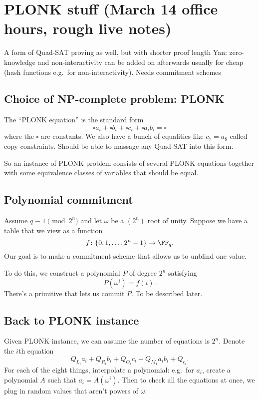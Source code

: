 \documentclass[11pt]{scrreprt}
\begin{document}
\appendix

\chapter{PLONK stuff (March 14 office hours, rough live notes)}
\begin{itemize}
  \ii A form of Quad-SAT proving as well, but with shorter proof length
  \ii Yan: zero-knowledge and non-interactivity can be added on afterwards
  usually for cheap
  (hash functions e.g.\ for non-interactivity).
  \ii Needs commitment schemes
\end{itemize}

\section{Choice of NP-complete problem: PLONK}
The ``PLONK equation'' is the standard form
\[ \square a_i + \square b_i + \square c_i + \square a_i b_i = \square \]
where the $\square$ are constants.
We also have a bunch of equalities like $c_7 = a_8$ called copy constraints.
Should be able to massage any Quad-SAT into this form.

So an instance of PLONK problem consists of several PLONK equations
together with some equivalence classes of variables that should be equal.

\section{Polynomial commitment}
Assume $q \equiv 1 \pmod{2^n}$
and let $\omega$ be a $(2^n)$ root of unity.
Suppose we have a table that we view as a function
\[ f \colon \{0,1,\dots,2^n-1\} \to \FF_q. \]
Our goal is to make a commitment scheme that allows us to unblind one value.

To do this, we construct a polynomial $P$ of degree $2^n$ satisfying
\[ P(\omega^i) = f(i). \]
There's a primitive that lets us commit $P$.
To be described later.

\section{Back to PLONK instance}
Given PLONK instance, we can assume the number of equations is $2^n$.
Denote the $i$th equation
\[ Q_{L_i} a_i + Q_{R_i} b_i + Q_{O_i} c_i + Q_{M_1} a_i b_i + Q_{c_i}. \]
For each of the eight things, interpolate a polynomial:
e.g.\ for $a_i$, create a polynomial $A$ such that $a_i = A(\omega^i)$.
Then to check all the equations at once,
we plug in random values that aren't powers of $\omega$.
\end{document}
